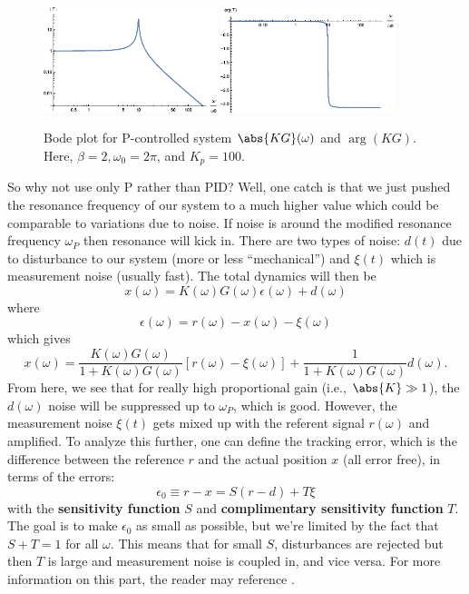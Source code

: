 \documentclass{article}
\theoremstyle{definition}
\newcommand{\f}[2]{\frac{#1}{#2}}
\begin{document}
\begin{figure}[!htb]
	\centering
	\includegraphics[width=0.45\textwidth]{bode_5}
	\quad
	\includegraphics[width=0.45\textwidth]{bode_6}
	\caption{Bode plot for P-controlled system $\abs{KG}(\omega)$ and $\arg(KG)$. Here, $\beta = 2,\omega_0 = 2\pi$, and $K_p = 100$.} %
	\label{fig:bode_3}
\end{figure}



So why not use only P rather than PID? Well, one catch is that we just pushed the resonance frequency of our system to a much higher value which could be comparable to variations due to noise. If noise is around the modified resonance frequency $\omega_P$ then resonance will kick in. There are two types of noise: $d(t)$ due to disturbance to our system (more or less ``mechanical'') and $\xi(t)$ which is measurement noise (usually fast). The total dynamics will then be 
\begin{equation*}
x(\omega) = K(\omega)G(\omega) \epsilon(\omega) + d(\omega)
\end{equation*}
where 
\begin{equation*}
\epsilon(\omega) = r(\omega) - x(\omega) - \xi(\omega)
\end{equation*}
which gives
\begin{equation*}
x(\omega) = \f{K(\omega)G(\omega)}{1+K(\omega)G(\omega)}[r(\omega)-\xi(\omega)] + \f{1}{1+K(\omega)G(\omega)}d(\omega).
\end{equation*}
From here, we see that for really high proportional gain (i.e., $\abs{K} \gg 1$), the $d(\omega)$ noise will be suppressed up to $\omega_P$, which is good. However, the measurement noise $\xi(t)$ gets mixed up with the referent signal $r(\omega)$ and amplified. To analyze this further, one can define the tracking error, which is the difference between the reference $r$ and the actual position $x$ (all error free), in terms of the errors:
\begin{equation*}
\epsilon_0 \equiv r - x = S(r-d) + T\xi
\end{equation*}
with the \textbf{sensitivity function} $S$ and \textbf{complimentary sensitivity function} $T$. The goal is to make $\epsilon_0$ as small as possible, but we're limited by the fact that $S+T=1$ for all $\omega$. This means that for small $S$, disturbances are rejected but then $T$ is large and measurement noise is coupled in, and vice versa.
For more information on this part, the reader may reference \cite{bechhoefer2005feedback}.
\end{document}
